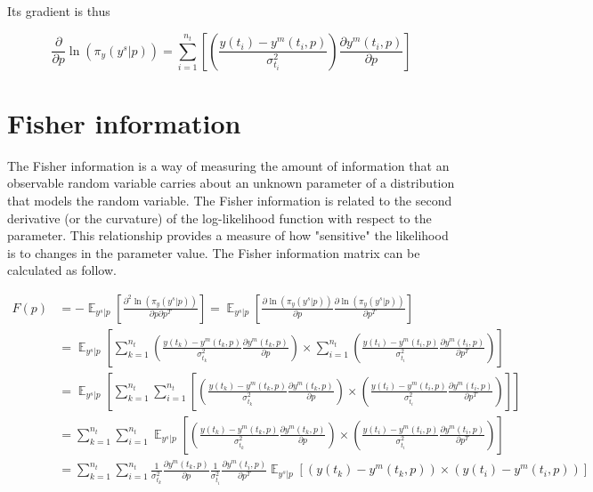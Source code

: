 \documentclass[]{scrartcl}
\begin{document}
Its gradient is thus

\begin{equation}
	\frac{\partial}{\partial p} \ln (\pi_y (y^s|p)) =  \sum_{i=1}^{n_t}  \left[ \left( \frac{y(t_i) - y^m(t_i, p)}{\sigma_{t_i}^2} \right) \frac{\partial y^m(t_i, p)}{\partial p} \right]
\end{equation}

\section{Fisher information}

The Fisher information is a way of measuring the amount of information that an observable random variable carries about an unknown parameter of a distribution that models the random variable. The Fisher information is related to the second derivative (or the curvature) of the log-likelihood function with respect to the parameter. This relationship provides a measure of how "sensitive" the likelihood is to changes in the parameter value. The Fisher information matrix can be calculated as follow.

\begin{align}
	F(p) &= - \mathop{\mathbb{E}}_{y^s|p} \left[ \frac{\partial^2 \ln (\pi_y (y^s|p))}{\partial p \partial p^T} \right] = \mathop{\mathbb{E}}_{y^s|p} \left[ \frac{\partial \ln (\pi_y (y^s|p))}{\partial p} \frac{\partial \ln (\pi_y (y^s|p))}{\partial p^T} \right] \nonumber \\
	&= \mathop{\mathbb{E}}_{y^s|p} \left[ \sum_{k=1}^{n_t} \left( \frac{y(t_k) - y^m(t_k, p)}{\sigma_{t_k}^2} \frac{\partial y^m(t_k, p)}{\partial p} \right) \times  \sum_{i=1}^{n_t} \left( \frac{y(t_i) - y^m(t_i, p)}{\sigma_{t_i}^2} \frac{\partial y^m(t_i, p)}{\partial p^T} \right) \right] \nonumber \\
	&= \mathop{\mathbb{E}}_{y^s|p} \left[ \sum_{k=1}^{n_t} \sum_{i=1}^{n_t} \left[ \left( \frac{y(t_k) - y^m(t_k, p)}{\sigma_{t_k}^2} \frac{\partial y^m(t_k, p)}{\partial p} \right) \times \left( \frac{y(t_i) - y^m(t_i, p)}{\sigma_{t_i}^2} \frac{\partial y^m(t_i, p)}{\partial p^T} \right) \right] \right] \nonumber \\
	&= \sum_{k=1}^{n_t} \sum_{i=1}^{n_t} \mathop{\mathbb{E}}_{y^s|p} \left[ \left( \frac{y(t_k) - y^m(t_k, p)}{\sigma_{t_k}^2} \frac{\partial y^m(t_k, p)}{\partial p} \right) \times \left( \frac{y(t_i) - y^m(t_i, p)}{\sigma_{t_i}^2} \frac{\partial y^m(t_i, p)}{\partial p^T} \right) \right] \nonumber \\
	&= \sum_{k=1}^{n_t} \sum_{i=1}^{n_t} \frac{1}{\sigma_{t_k}^2} \frac{\partial y^m(t_k, p)}{\partial p} \frac{1}{\sigma_{t_i}^2} \frac{\partial y^m(t_i, p)}{\partial p^T} \mathop{\mathbb{E}}_{y^s|p} \left[ \left( y(t_k) - y^m(t_k, p) \right) \times \left( y(t_i) - y^m(t_i, p) \right) \right] 
\end{align}
\end{document}
